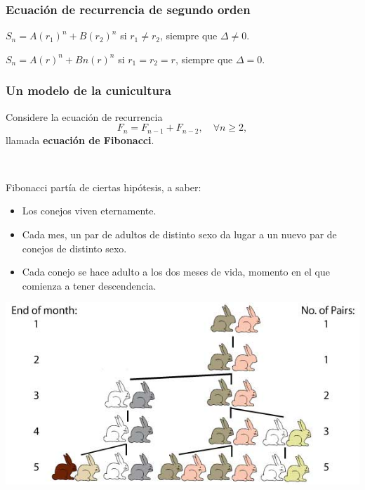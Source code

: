 \begin{frame}
\frametitle{Ecuación de recurrencia de segundo orden}

\begin{theorem}
$S_n = A(r_1)^n + B(r_2)^n$ si $r_1 \neq r_2$, siempre que $\Delta\neq0$.
\end{theorem}

\begin{theorem}
$S_n = A(r)^n + Bn(r)^n$ si $r_1 = r_2 = r$, siempre que $\Delta=0$.
\end{theorem}
\end{frame}

\begin{frame}
\frametitle{Un modelo de la cunicultura}
Considere la ecuación de recurrencia \[ F_{n}=F_{n-1}+F_{n-2},\quad\forall n\geq2, \] llamada \textbf{ecuación de Fibonacci}.

\

\begin{minipage}{0.45\paperwidth}
Fibonacci partía de ciertas hipótesis, a saber:
	\begin{itemize}
		\item Los conejos viven eternamente.
		\item Cada mes, un par de adultos de distinto sexo da lugar a un nuevo par de conejos de distinto sexo.
		\item Cada conejo se hace adulto a los dos meses de vida, momento en el que comienza a tener descendencia.
	\end{itemize}
\end{minipage}
\hfill
\begin{minipage}{0.45\paperwidth}
	\includegraphics[width=0.4\paperwidth]{conejos.jpg}
\end{minipage}

\end{frame}